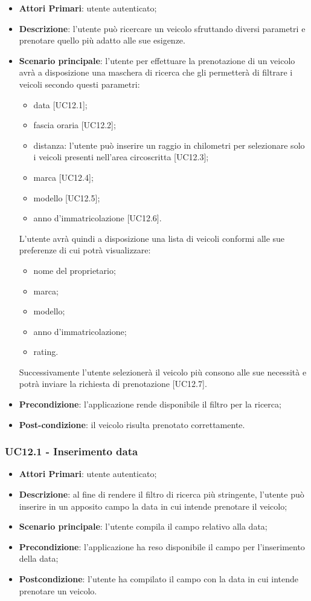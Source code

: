\begin{itemize}
	\item \textbf{Attori Primari}: utente autenticato;
	\item \textbf{Descrizione}: l'utente può ricercare un veicolo sfruttando diversi parametri e prenotare quello più adatto alle sue esigenze.
	\item \textbf{Scenario principale}: l'utente per effettuare la prenotazione di un veicolo avrà a disposizione una maschera di ricerca che gli permetterà di filtrare i veicoli secondo questi parametri:
	\begin{itemize}
		\item data [UC12.1];
		\item fascia oraria [UC12.2];
		\item distanza: l'utente può inserire un raggio in chilometri per selezionare solo i veicoli presenti nell'area circoscritta [UC12.3]; 
		\item marca [UC12.4];
		\item modello [UC12.5];
		\item anno d'immatricolazione [UC12.6].
	\end{itemize}
	L'utente avrà quindi a disposizione una lista di veicoli conformi alle sue preferenze di cui potrà visualizzare:
	\begin{itemize}		
		\item nome del proprietario;
		\item marca;
		\item modello;
		\item anno d'immatricolazione;
		\item rating.
	\end{itemize}
	Successivamente l'utente selezionerà il veicolo più consono alle sue necessità e potrà inviare la richiesta di prenotazione [UC12.7].
	\item \textbf{Precondizione}: l'applicazione rende disponibile il filtro per la ricerca;
	\item \textbf{Post-condizione}: il veicolo risulta prenotato correttamente.
\end{itemize} 
\subsubsection{UC12.1 - Inserimento data}
\begin{itemize}
	\item \textbf{Attori Primari}: utente autenticato;
	\item \textbf{Descrizione}: al fine di rendere il filtro di ricerca più stringente, l'utente può inserire in un apposito campo la data in cui intende prenotare il veicolo;
	\item \textbf{Scenario principale}: l'utente compila il campo relativo alla data;	
	\item \textbf{Precondizione}: l'applicazione ha reso disponibile il campo per l'inserimento della data;
	\item \textbf{Postcondizione}: l'utente ha compilato il campo con la data in cui intende prenotare un veicolo.	
\end{itemize}
